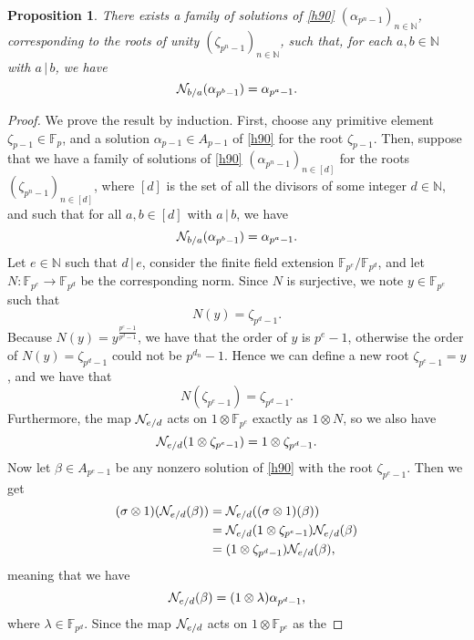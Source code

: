 \documentclass{sig-alternate}
\newtheorem{proposition}{Proposition}
\begin{document}
\begin{proposition}
  There exists a family of solutions of \eqref{h90}
  $(\alpha_{p^n-1})_{n\in\mathbb{N}}$, corresponding to the roots of unity
  $(\zeta_{p^n-1})_{n\in\mathbb{N}}$, such that, for each $a,b\in\mathbb{N}$
  with $a\,|\,b$, we have
  \[
    \mathcal{N}_{b/a}(\alpha_{p^b-1})=\alpha_{p^a-1}.
  \]
\end{proposition}
\begin{proof}


  We prove the result by induction. First, choose any primitive element
  $\zeta_{p-1}\in\mathbb{F}_p$, and a solution $\alpha_{p-1}\in
  A_{p-1}$ of \eqref{h90} for the root $\zeta_{p-1}$. Then, suppose that we have
  a family of solutions of \eqref{h90} $(\alpha_{p^n-1})_{n\in \left[ d
  \right]}$ for the roots
  $(\zeta_{p^n-1})_{n\in \left[ d \right]}$, where $\left[ d \right]$ is
  the set of all the divisors of some integer $d\in\mathbb{N}$, and such that for all $a,
  b\in \left[ d \right]$ with $a\,|\,b$, we have
  \[
    \mathcal{N}_{b/a}(\alpha_{p^b-1})=\alpha_{p^a-1}.
  \]
  Let $e\in\mathbb{N}$ such that $d\,|\,e$, consider the
  finite field extension $\mathbb{F}_{p^{e}}/\mathbb{F}_{p^{d}}$, and
  let $N:\mathbb{F}_{p^{e}}\to\mathbb{F}_{p^{d}}$ be the corresponding
  norm. Since $N$ is surjective, we note $y\in\mathbb{F}_{p^{e}}$ such
  that
  \[
    N(y) = \zeta_{p^{d}-1}.
  \]
  Because $N(y)=y^{\frac{p^{e}-1}{p^{d}-1}}$, we have that the order of
  $y$ is $p^{e}-1$, otherwise the order of $N(y)=\zeta_{p^{d}-1}$ could not
  be $p^{d_n}-1$. Hence we can define a new root $\zeta_{p^{e}-1}=y$, and we
  have that
  \[
    N(\zeta_{p^{e}-1})=\zeta_{p^{d}-1}.
  \]
  Furthermore, the map $\mathcal{N}_{e/d}$ acts on
  $1\otimes\mathbb{F}_{p^{e}}$ exactly as $1\otimes N$, so we also have
  \[
    \mathcal{N}_{e/d}(1\otimes\zeta_{p^{e}-1}) = 1\otimes\zeta_{p^{d}-1}.
  \]
Now let
$\beta\in A_{p^{e}-1}$ be any nonzero solution of \eqref{h90} with the root
$\zeta_{p^{e}-1}$.
Then we get
\begin{align*}
  (\sigma\otimes1)(\mathcal{N}_{e/d}(\beta)) &= \mathcal{N}_{e/d}((\sigma\otimes1)(\beta)) \\
  &= \mathcal{N}_{e/d}(1\otimes\zeta_{p^{e}-1}) \mathcal{N}_{e/d}(\beta) \\
  &= (1\otimes\zeta_{p^{d}-1})\mathcal{N}_{e/d}(\beta),
\end{align*}
meaning that we have
\[
  \mathcal{N}_{e/d}(\beta)=(1\otimes\lambda)\alpha_{p^{d}-1},
\]
where $\lambda\in\mathbb{F}_{p^d}$. Since the map
$\mathcal{N}_{e/d}$ acts on $1\otimes\mathbb{F}_{p^{e}}$ as the

\end{proof}
\end{document}
